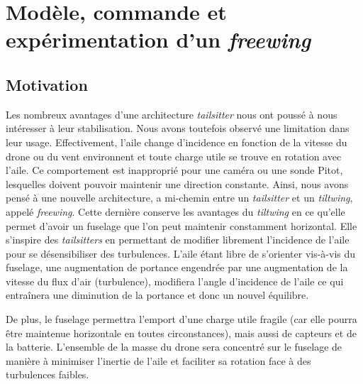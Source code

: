 
\chapter{Modèle, commande et expérimentation d'un \textit{freewing}}
\minitoc
\label{chap:colibri}



\section{Motivation}
\label{sec:motivationcolibri}
Les nombreux avantages d'une architecture \textit{tailsitter} nous ont poussé à nous intéresser à leur stabilisation. Nous avons toutefois observé une limitation dans leur usage. Effectivement, l'aile change d'incidence en fonction de la vitesse du drone ou du vent environnent et toute charge utile se trouve en rotation avec l'aile. Ce comportement est inapproprié pour une caméra ou une sonde Pitot, lesquelles doivent pouvoir maintenir une direction constante. Ainsi, nous avons pensé à une nouvelle architecture, a mi-chemin entre un \textit{tailsitter} et un \textit{tiltwing}, appelé \textit{freewing}. Cette dernière conserve les avantages du \textit{tiltwing} en ce qu'elle permet d'avoir un fuselage que l'on peut maintenir constamment horizontal. Elle s'inspire des \textit{tailsitters} en permettant de modifier librement l'incidence de l'aile pour se désensibiliser des turbulences. L'aile étant libre de s'orienter vis-à-vis du fuselage, une augmentation de portance engendrée par une augmentation de la vitesse du flux d'air (turbulence), modifiera l'angle d'incidence de l'aile ce qui entraînera une diminution de la portance et donc un nouvel équilibre.

De plus, le fuselage permettra l'emport d'une charge utile fragile (car elle pourra être maintenue horizontale en toutes circonstances), mais aussi de capteurs et de la batterie. L'ensemble de la masse du drone sera concentré sur le fuselage de manière à minimiser l'inertie de l'aile et faciliter sa rotation face à des turbulences faibles.

